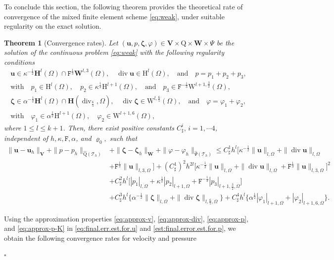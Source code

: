 \documentclass[11pt, reqno, a4paper, twoside]{article}
\newcommand{\bu}{\boldsymbol{u}}
\newcommand\bzeta{\boldsymbol{\zeta}}
\newcommand{\rF}{\mathtt{F}}
\newcommand{\rH}{\mathrm{H}}
\newcommand{\rW}{\mathrm{W}}
\newcommand{\rQ}{\mathrm{Q}}
\newcommand{\bH}{\mathbf{H}}
\newcommand{\bW}{\mathbf{W}}
\newcommand{\bV}{\mathbf{V}}
\newcommand{\cT}{\mathcal{T}}
\newcommand\vdiv{\mathop{\mathrm{div}}\nolimits}
\newtheorem{theorem}{Theorem}[section]
\newenvironment{proof}{\noindent{\it Proof.}}{\hfill$\square$}
\numberwithin{equation}{section}
\numberwithin{remark}{section}
\numberwithin{figure}{section}
\numberwithin{table}{section}
\begin{document}
{To conclude this section, the following theorem provides the theoretical rate of convergence of the mixed finite element scheme \eqref{eq:weak}, under suitable regularity on the exact solution. 
 \begin{theorem}[Convergence rates]\label{th:convergence}
        Let $(\bu,p,\bzeta,\varphi) \in \bV \times \rQ \times \bW\times \Psi$ be the solution of the continuous problem \eqref{eq:weak}  with the following regularity conditions
{\begin{gather*}\bu\in \kappa^{-\frac12}{\bH^{l}}(\Omega)\cap{\rF^{\frac13}\mathbf{W}^{l,3}(\Omega)},  \quad \vdiv\bu\in {\rH^l}(\Omega), \quad \text{and} \quad {p=p_1+p_2+p_3}, \\
\text{with} \quad {p_1\in \rH^{l}(\Omega), \quad p_2\in \kappa^{\frac12}\rH^{l+1}(\Omega), \quad \text{and}\quad  p_3 \in \rF^{-\frac13}\rW^{l+1,\frac32}(\Omega)},\\
\bzeta\in \alpha^{-\frac12}\bH^{l}(\Omega)\cap\bH(\vdiv_{\frac65},\Omega), \quad \vdiv\bzeta\in {\rW}^{l,\frac65}(\Omega), \quad \text{and} \quad \varphi=\varphi_1+\varphi_2,\\
\text{with}\quad\varphi_1\in \alpha^{\frac12}\rH^{l+1}(\Omega),\quad \varphi_2\in\rW^{l+1,6}(\Omega),
\end{gather*}
where \(1\leq l\leq k+1\).  }
Then, there exist positive constants \(C^i_\sharp,\,i=1,\cdots4\), independent of \(h, \kappa, \rF, \alpha\), and \(\varrho_0,\) such that 
\begin{align*}
 \|\bu-\bu_h\|_{\bV}+\|p-p_h\|_{\widehat{\rQ}(\cT_h)}&+\|\bzeta-\bzeta_h\|_{\bW}+\|\varphi-\varphi_h\|_{\widehat{\Psi}(\cT_h)}\leq C^1_\sharp h^{l}\bigl[\kappa^{-\frac12}\|\bu\|_{l,\Omega}+\|\vdiv\bu\|_{l,\Omega}\\&+\rF^{\frac13}\|\bu\|_{l,3,\Omega}\bigr]+{(C^1_\sharp)^2 h^{2l}\bigl[\kappa^{-\frac12}\|\bu\|_{l,\Omega}+\|\vdiv\bu\|_{l,\Omega}+\rF^{\frac13}\|\bu\|_{l,3,\Omega}\bigr]^2}\\& +{C^2_\sharp h^{l}\bigl[ |p_1|_{l,\Omega}+\kappa^{\frac12}|p_2|_{l+1,\Omega}+\rF^{-\frac13}|p_3|_{l+1,\frac32,\Omega}\bigr]}\\&+{C^3_\sharp h^{l}\{\alpha^{-\frac12}\|\bzeta\|_{l,\Omega}+\|\vdiv\bzeta\|_{l,\frac65,\Omega}\}} +{C^4_\sharp h^{l}\{\alpha^{\frac12}|\varphi_1|_{l+1,\Omega}+|\varphi_2|_{l+1,6,\Omega}\}}.
\end{align*}
    \end{theorem}
    \begin{proof}  
        {Using the approximation properties \eqref{eq:approx-v}, \eqref{eq:approx-div}, \eqref{eq:approx-p},  and \eqref{eq:approx-p-K} in \eqref{eq:final.err.est.for.u} and \eqref{est:final.error.est.for.p}, we obtain the following convergence rates for velocity and pressure}

\end{proof}}
\end{document}
